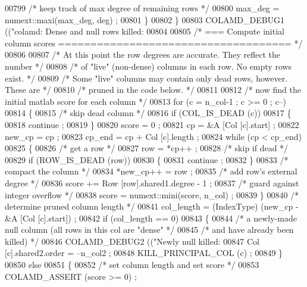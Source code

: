 \begin{DoxyCode}
{{{{{{{{{{{{{00799       \textcolor{comment}{/* keep track of max degree of remaining rows */}
00800       max\_deg = numext::maxi(max\_deg, deg) ;
00801     \}
00802   \}
00803   COLAMD\_DEBUG1 ((\textcolor{stringliteral}{"colamd: Dense and null rows killed: %
00804 
00805   \textcolor{comment}{/* === Compute initial column scores ==================================== */}
00806 
00807   \textcolor{comment}{/* At this point the row degrees are accurate.  They reflect the number */}
00808   \textcolor{comment}{/* of "live" (non-dense) columns in each row.  No empty rows exist. */}
00809   \textcolor{comment}{/* Some "live" columns may contain only dead rows, however.  These are */}
00810   \textcolor{comment}{/* pruned in the code below. */}
00811 
00812   \textcolor{comment}{/* now find the initial matlab score for each column */}
00813   \textcolor{keywordflow}{for} (c = n\_col-1 ; c >= 0 ; c--)
00814   \{
00815     \textcolor{comment}{/* skip dead column */}
00816     \textcolor{keywordflow}{if} (COL\_IS\_DEAD (c))
00817     \{
00818       continue ;
00819     \}
00820     score = 0 ;
00821     cp = &A [Col [c].start] ;
00822     new\_cp = cp ;
00823     cp\_end = cp + Col [c].length ;
00824     \textcolor{keywordflow}{while} (cp < cp\_end)
00825     \{
00826       \textcolor{comment}{/* get a row */}
00827       row = *cp++ ;
00828       \textcolor{comment}{/* skip if dead */}
00829       \textcolor{keywordflow}{if} (ROW\_IS\_DEAD (row))
00830       \{
00831     continue ;
00832       \}
00833       \textcolor{comment}{/* compact the column */}
00834       *new\_cp++ = row ;
00835       \textcolor{comment}{/* add row's external degree */}
00836       score += Row [row].shared1.degree - 1 ;
00837       \textcolor{comment}{/* guard against integer overflow */}
00838       score = numext::mini(score, n\_col) ;
00839     \}
00840     \textcolor{comment}{/* determine pruned column length */}
00841     col\_length = (IndexType) (new\_cp - &A [Col [c].start]) ;
00842     \textcolor{keywordflow}{if} (col\_length == 0)
00843     \{
00844       \textcolor{comment}{/* a newly-made null column (all rows in this col are "dense" */}
00845       \textcolor{comment}{/* and have already been killed) */}
00846       COLAMD\_DEBUG2 ((\textcolor{stringliteral}{"Newly null killed: %
00847       Col [c].shared2.order = --n\_col2 ;
00848       KILL\_PRINCIPAL\_COL (c) ;
00849     \}
00850     \textcolor{keywordflow}{else}
00851     \{
00852       \textcolor{comment}{/* set column length and set score */}
00853       COLAMD\_ASSERT (score >= 0) ;
}}}}}}}}}}}}}}}
\end{DoxyCode}
